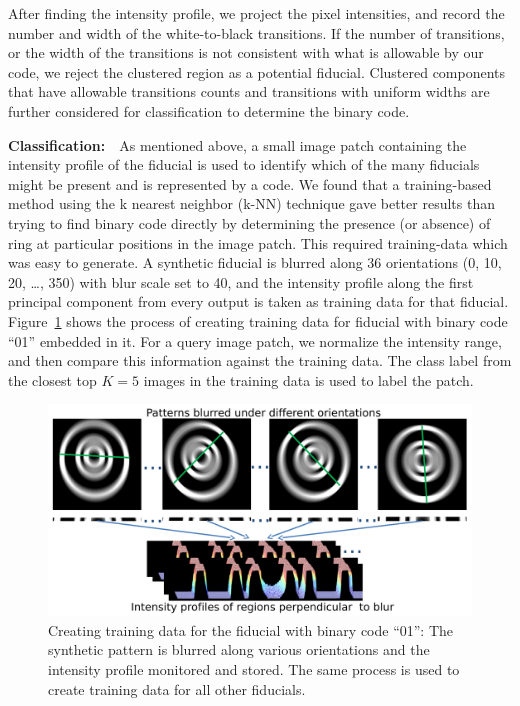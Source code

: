 \documentclass[10pt,twocolumn,letterpaper]{article}
\begin{document}
After finding the intensity profile, we project the pixel intensities,
and record the number and width of the white-to-black transitions.  If
the number of transitions, or the width of the transitions is not
consistent with what is allowable by our code, we reject the clustered
region as a potential fiducial.  Clustered components that have
allowable transitions counts and transitions with uniform widths are
further considered for classification to determine the binary code.

\textbf{Classification:}~~As mentioned above, a small image patch
containing the intensity profile of the fiducial is used to identify
which of the many fiducials might be present and is represented by a
code.  We found that a training-based method using the k nearest
neighbor (k-NN) technique gave better results than trying to find
binary code directly by determining the presence (or absence) of ring
at particular positions in the image patch. This required
training-data which was easy to generate. A synthetic fiducial
is blurred along 36 orientations (0, 10, 20, \ldots , 350) with blur
scale set to 40, and the intensity profile along the first principal
component from every output is taken as training data for that
fiducial. Figure~\ref{fig:training_data} shows the process of
creating training data for fiducial with binary code ``01'' embedded
in it.  For a query image patch, we normalize the intensity range, and
then compare this information against the training data. The class
label from the closest top $K=5$ images in the training data is used
to label the patch.

\begin{figure}[h!]
\centering
  \includegraphics[width=0.95\linewidth]{images/training_data.pdf}
  \caption{Creating training data for the fiducial with binary
  code ``01'': The synthetic pattern is blurred along various
  orientations and the intensity profile monitored and stored. The
  same process is used to create training data for all other fiducials.}
  \label{fig:training_data}
\end{figure}
\end{document}
